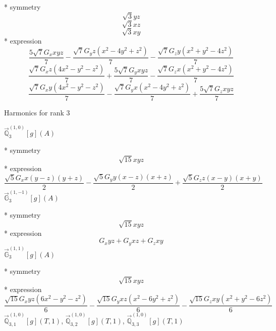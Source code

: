 \documentclass[fleqn,8pt]{jsarticle}
\begin{document}
\noindent\quad ** symmetry
\begin{dmath*}
\sqrt{3} y z
\end{dmath*}
\begin{dmath*}
\sqrt{3} x z
\end{dmath*}
\begin{dmath*}
\sqrt{3} x y
\end{dmath*}
\noindent\quad ** expression
\begin{dmath*}
\frac{5 \sqrt{7} G_{x} x y z}{7} - \frac{\sqrt{7} G_{y} z \left(x^{2} - 4 y^{2} + z^{2}\right)}{7} - \frac{\sqrt{7} G_{z} y \left(x^{2} + y^{2} - 4 z^{2}\right)}{7}
\end{dmath*}
\begin{dmath*}
\frac{\sqrt{7} G_{x} z \left(4 x^{2} - y^{2} - z^{2}\right)}{7} + \frac{5 \sqrt{7} G_{y} x y z}{7} - \frac{\sqrt{7} G_{z} x \left(x^{2} + y^{2} - 4 z^{2}\right)}{7}
\end{dmath*}
\begin{dmath*}
\frac{\sqrt{7} G_{x} y \left(4 x^{2} - y^{2} - z^{2}\right)}{7} - \frac{\sqrt{7} G_{y} x \left(x^{2} - 4 y^{2} + z^{2}\right)}{7} + \frac{5 \sqrt{7} G_{z} x y z}{7}
\end{dmath*}

\noindent * Harmonics for rank 3

\noindent\quad $\vec{\mathbb{Q}}_{3}^{(1,0)}[g](A)$

\noindent\quad ** symmetry
\begin{dmath*}
\sqrt{15} x y z
\end{dmath*}
\noindent\quad ** expression
\begin{dmath*}
\frac{\sqrt{5} G_{x} x \left(y - z\right) \left(y + z\right)}{2} - \frac{\sqrt{5} G_{y} y \left(x - z\right) \left(x + z\right)}{2} + \frac{\sqrt{5} G_{z} z \left(x - y\right) \left(x + y\right)}{2}
\end{dmath*}
\noindent\quad $\vec{\mathbb{G}}_{3}^{(1,-1)}[g](A)$

\noindent\quad ** symmetry
\begin{dmath*}
\sqrt{15} x y z
\end{dmath*}
\noindent\quad ** expression
\begin{dmath*}
G_{x} y z + G_{y} x z + G_{z} x y
\end{dmath*}
\noindent\quad $\vec{\mathbb{G}}_{3}^{(1,1)}[g](A)$

\noindent\quad ** symmetry
\begin{dmath*}
\sqrt{15} x y z
\end{dmath*}
\noindent\quad ** expression
\begin{dmath*}
\frac{\sqrt{15} G_{x} y z \left(6 x^{2} - y^{2} - z^{2}\right)}{6} - \frac{\sqrt{15} G_{y} x z \left(x^{2} - 6 y^{2} + z^{2}\right)}{6} - \frac{\sqrt{15} G_{z} x y \left(x^{2} + y^{2} - 6 z^{2}\right)}{6}
\end{dmath*}
\noindent\quad $\vec{\mathbb{Q}}_{3,1}^{(1,0)}[g](T,1)$, $\vec{\mathbb{Q}}_{3,2}^{(1,0)}[g](T,1)$, $\vec{\mathbb{Q}}_{3,3}^{(1,0)}[g](T,1)$
\end{document}
